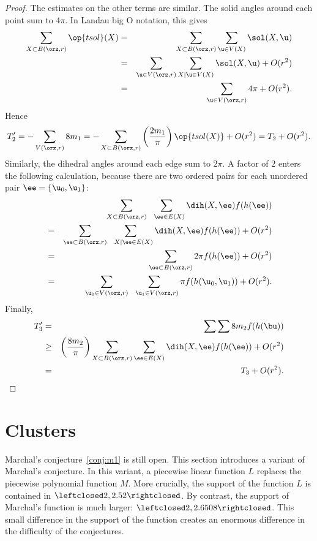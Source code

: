 \begin{proof}
The estimates on the other terms are similar.  The solid angles
around each point sum to $4\pi$.
In Landau big O notation, this gives
\begin{eqnarray*} 
\sum_{X\subset B(\orz,r)} \op{tsol}(X) &=& 
\sum_{X\subset B(\orz,r)} \sum_{ \u\in V( X)} \sol(X, \u)\\
&=&\sum_{ \u\in  V(\orz,r)} \sum_{X\mid  \u\in V( X)} \sol(X, \u) + O(r^2)\\
&=&\sum_{ \u\in  V(\orz,r)} 4\pi    + O(r^2).
\end{eqnarray*}
Hence
\begin{displaymath} 
T_2' = -\sum_{ V(\orz,r)} 8 m_1 = 
-\sum_{X\subset B(\orz,r)}\left(\frac{2m_1}\pi\right) \op{tsol(X)} + O(r^2) = T_2 + O(r^2).
\end{displaymath}
Similarly, the dihedral angles around each edge sum to $2\pi$.  A
factor of $2$ enters the following calculation, because there are two
ordered pairs for each unordered pair $\ee=\{ \u_0, \u_1\}$:
\begin{eqnarray*} 
&\phantom{=}&\sum_{X\subset B(\orz,r)} \sum_{~~\ee\in E(X)} \dih(X,\ee)  f(h(\ee)) \vspace{3pt}\\
&=&\sum_{\ee\subset B(\orz,r)} \sum_{~~X\mid \ee\in E(X)} \dih(X,\ee)  f(h(\ee)) +O(r^2)\vspace{3pt}\\
&=&\sum_{\ee\subset B(\orz,r)} 2\pi f(h(\ee)) + O(r^2)\vspace{3pt} \\
&=&\sum_{ \u_0\in  V(\orz,r)} \sum_{~~\u_1\in  V(\orz,r) } \pi f(h( \u_0, \u_1)) + O(r^2).\\
\end{eqnarray*}
Finally,
\begin{eqnarray*} 
T_3' &=& \sum\sum 8 m_2 f(h(\bu)) \\
&\ge& \left(\frac{8m_2}\pi\right)
\sum_{X\subset B(\orz,r)}\sum_{\ee\in E(X)}\dih(X,\ee) f(h(\ee)) + O(r^2) \\
&=& T_3 + O(r^2).
\end{eqnarray*}
\end{proof}




\section{Clusters}

Marchal's conjecture~\ref{conj:m1} is still open.  This section
introduces a variant of Marchal's conjecture.  In this variant,
a piecewise linear function $L$ replaces the piecewise polynomial
function $M$.  More crucially, the support of the function $L$ is
contained in $\leftclosed2,2.52\rightclosed$.  By contrast, the
support of Marchal's function is much larger:
$\leftclosed2,2.6508\rightclosed$.  This small difference in the
support of the function creates an enormous difference in the
difficulty of the conjectures.

